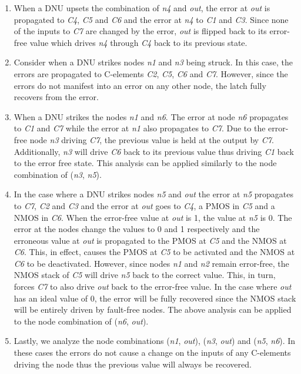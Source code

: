 \begin{enumerate}
	\item When a DNU upsets the combination of \textit{n4} and \textit{out}, the error at \textit{out} is propagated to \textit{C4}, \textit{C5} and \textit{C6} and the error at \textit{n4} to \textit{C1} and \textit{C3}. Since none of the inputs to \textit{C7} are changed by the error, \textit{out} is flipped back to its error-free value which drives \textit{n4} through \textit{C4} back to its previous state.

	\item Consider when a DNU strikes nodes \textit{n1} and \textit{n3} being struck. In this case, the errors are propagated to C-elements \textit{C2}, \textit{C5}, \textit{C6} and \textit{C7}. However, since the errors do not manifest into an error on any other node, the latch fully recovers from the error. 
	
	\item When a DNU strikes the nodes \textit{n1} and \textit{n6}. The error at node \textit{n6} propagates to  \textit{C1} and \textit{C7} while the error at \textit{n1} also propagates to \textit{C7}. Due to the error-free node \textit{n3} driving \textit{C7}, the previous value is held at the output by \textit{C7}. Additionally, \textit{n3} will drive \textit{C6} back to its previous value thus driving \textit{C1} back to the error free state. This analysis can be applied similarly to the node combination of (\textit{n3}, \textit{n5}). 

	\item In the case where a DNU strikes nodes \textit{n5} and \textit{out} the error at \textit{n5} propagates to \textit{C7}, \textit{C2} and \textit{C3} and the error at \textit{out} goes to \textit{C4}, a PMOS in \textit{C5} and a NMOS in \textit{C6}. When the error-free value at \textit{out} is 1, the value at \textit{n5} is 0. The error at the nodes change the values to 0 and 1 respectively and the erroneous value at \textit{out} is propagated to the PMOS at \textit{C5} and the NMOS at \textit{C6}. This, in effect, causes the PMOS at \textit{C5} to be activated and the NMOS at \textit{C6} to be deactivated. However, since nodes \textit{n1} and \textit{n2} remain error-free, the NMOS stack of \textit{C5} will drive \textit{n5} back to the correct value. This, in turn, forces \textit{C7} to also drive \textit{out} back to the error-free value. In the case where \textit{out} has an ideal value of 0, the error will be fully recovered since the NMOS stack will be entirely driven by fault-free nodes. The above analysis can be applied to the node combination of (\textit{n6}, \textit{out}). 
	
	\item Lastly, we analyze the node combinations (\textit{n1}, \textit{out}), (\textit{n3}, \textit{out}) and (\textit{n5}, \textit{n6}). In these cases the errors do not cause a change on the inputs of any C-elements driving the node thus the previous value will always be recovered. 
\end{enumerate}

